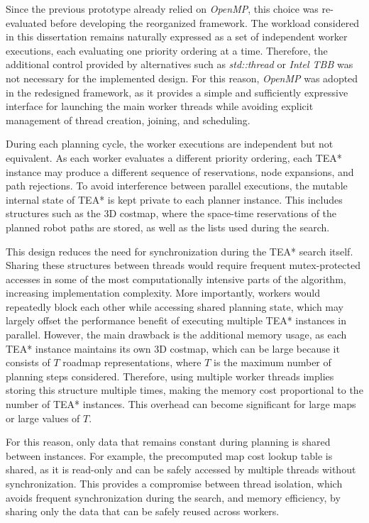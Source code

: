 Since the previous prototype already relied on \textit{OpenMP}, this choice was re-evaluated before
developing the reorganized framework. The workload considered in this dissertation remains
naturally expressed as a set of independent worker executions, each evaluating one priority
ordering at a time. Therefore, the additional control provided by alternatives such as
\textit{std::thread} or \textit{Intel TBB} was not necessary for the implemented design. For this reason, \textit{OpenMP} was adopted in the redesigned framework, as it provides a simple
and sufficiently expressive interface for launching the main worker threads while avoiding explicit
management of thread creation, joining, and scheduling.

During each planning cycle, the worker executions are independent but not equivalent. As each
worker evaluates a different priority ordering, each TEA* instance may produce a different sequence
of reservations, node expansions, and path rejections. To avoid interference between parallel
executions, the mutable internal state of TEA* is kept private to each planner instance. This includes
structures such as the 3D costmap, where the space-time reservations of the planned robot paths are
stored, as well as the lists used during the search.

This design reduces the need for synchronization during the TEA* search itself. Sharing these
structures between threads would require frequent mutex-protected accesses in some of the most
computationally intensive parts of the algorithm, increasing implementation complexity. More
importantly, workers would repeatedly block each other while accessing shared planning state,
which may largely offset the performance benefit of executing multiple TEA* instances in
parallel. However, the main drawback is the additional memory usage,
as each TEA* instance maintains its own 3D costmap, which can be large because it consists of
\(T\) roadmap representations, where \(T\) is the maximum number of planning steps considered.
Therefore, using multiple worker threads implies storing this structure multiple times, making the
memory cost proportional to the number of TEA* instances. This overhead can become significant
for large maps or large values of \(T\).

For this reason, only data that remains constant during planning is shared between instances. For
example, the precomputed map cost lookup table is shared, as it is read-only and can be safely
accessed by multiple threads without synchronization. This provides a compromise between thread
isolation, which avoids frequent synchronization during the search, and memory efficiency, by
sharing only the data that can be safely reused across workers.

